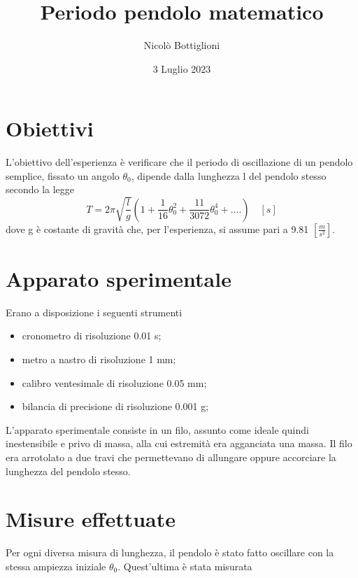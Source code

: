 \documentclass{article}
\begin{document}
	\author{Nicolò Bottiglioni}
	\title{Periodo pendolo matematico}
	\date{3 Luglio 2023}
	\maketitle
	
	\section{Obiettivi}
	L'obiettivo dell'esperienza è verificare che il periodo di oscillazione di un pendolo semplice, fissato un angolo $\theta_{0}$, dipende dalla lunghezza l del pendolo stesso secondo la legge 
	\begin{equation}
		T=2\pi\sqrt{\frac{l}{g}}(1 + \frac{1}{16}\theta_{0}^{2} + \frac{11}{3072}\theta_{0}^{4} + ....) \quad [s]
	\end{equation}
	dove g è costante di gravità che, per l'esperienza, si assume pari a 9.81 $[\frac{m}{s^{2}}]$.
	
	\section{Apparato sperimentale}
	Erano a disposizione i seguenti strumenti
	\begin{itemize}
		\item cronometro di risoluzione 0.01 s;
		\item metro a nastro di risoluzione 1 mm;
		\item calibro ventesimale di risoluzione 0.05 mm;
		\item bilancia di precisione di risoluzione 0.001 g;
	\end{itemize}
	L'apparato sperimentale consiste in un filo, assunto come ideale quindi inestensibile e privo di massa, alla cui estremità era agganciata una massa. Il filo era arrotolato a due travi che permettevano di allungare oppure accorciare la lunghezza del pendolo stesso.
	
	\section{Misure effettuate}
	Per ogni diversa misura di lunghezza, il pendolo è stato fatto oscillare con la stessa ampiezza iniziale $\theta_{0}$. Quest'ultima è stata misurata 
\end{document}
